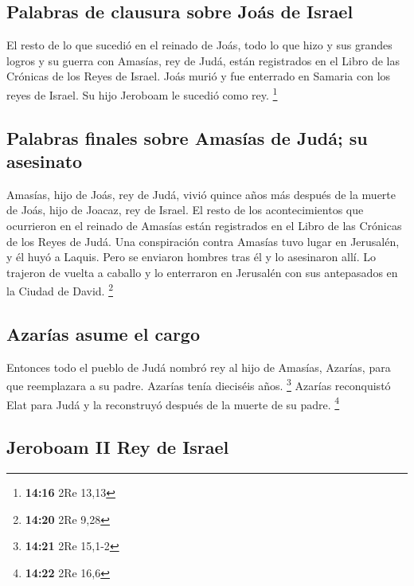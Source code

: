 \hypertarget{palabras-de-clausura-sobre-jouxe1s-de-israel}{%
\subsection{Palabras de clausura sobre Joás de
Israel}\label{palabras-de-clausura-sobre-jouxe1s-de-israel}}

 El resto de lo que sucedió en el reinado de Joás, todo
lo que hizo y sus grandes logros y su guerra con Amasías, rey de Judá,
están registrados en el Libro de las Crónicas de los Reyes de Israel.
 Joás murió y fue enterrado en Samaria con los reyes de
Israel. Su hijo Jeroboam le sucedió como rey. \footnote{\textbf{14:16}
  2Re 13,13}

\hypertarget{palabras-finales-sobre-amasuxedas-de-juduxe1-su-asesinato}{%
\subsection{Palabras finales sobre Amasías de Judá; su
asesinato}\label{palabras-finales-sobre-amasuxedas-de-juduxe1-su-asesinato}}

 Amasías, hijo de Joás, rey de Judá, vivió quince años
más después de la muerte de Joás, hijo de Joacaz, rey de Israel.
 El resto de los acontecimientos que ocurrieron en el
reinado de Amasías están registrados en el Libro de las Crónicas de los
Reyes de Judá.  Una conspiración contra Amasías tuvo
lugar en Jerusalén, y él huyó a Laquis. Pero se enviaron hombres tras él
y lo asesinaron allí.  Lo trajeron de vuelta a caballo y
lo enterraron en Jerusalén con sus antepasados en la Ciudad de David.
\footnote{\textbf{14:20} 2Re 9,28}

\hypertarget{azaruxedas-asume-el-cargo}{%
\subsection{Azarías asume el cargo}\label{azaruxedas-asume-el-cargo}}

 Entonces todo el pueblo de Judá nombró rey al hijo de
Amasías, Azarías, para que reemplazara a su padre. Azarías tenía
dieciséis años. \footnote{\textbf{14:21} 2Re 15,1-2} 
Azarías reconquistó Elat para Judá y la reconstruyó después de la muerte
de su padre. \footnote{\textbf{14:22} 2Re 16,6}

\hypertarget{jeroboam-ii-rey-de-israel}{%
\subsection{Jeroboam II Rey de Israel}\label{jeroboam-ii-rey-de-israel}}

